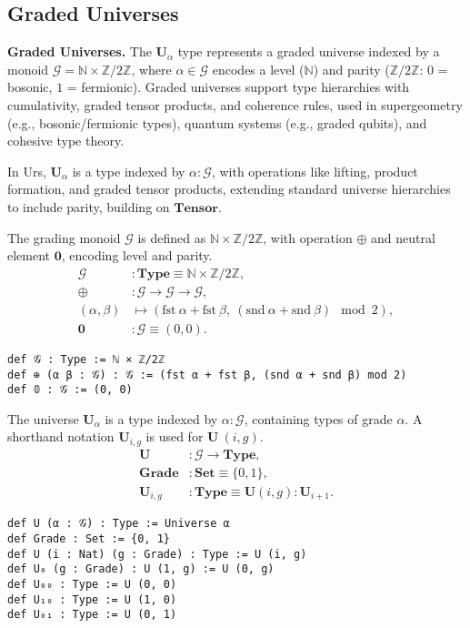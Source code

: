 \documentclass{article}
\begin{document}
\newpage
\subsection{Graded Universes}

\textbf{Graded Universes.}
The $\mathbf{U}_\alpha$ type represents a graded universe indexed by a monoid
$\mathcal{G} = \mathbb{N} \times \mathbb{Z}/2\mathbb{Z}$, where $\alpha \in \mathcal{G}$
encodes a level ($\mathbb{N}$) and parity ($\mathbb{Z}/2\mathbb{Z}$: $0$ = bosonic, $1$ = fermionic).
Graded universes support type hierarchies with cumulativity, graded tensor products,
and coherence rules, used in supergeometry (e.g., bosonic/fermionic types),
quantum systems (e.g., graded qubits), and cohesive type theory.

In Urs, $\mathbf{U}_\alpha$ is a type indexed by $\alpha : \mathcal{G}$, with operations
like lifting, product formation, and graded tensor products, extending standard
universe hierarchies to include parity, building on $\mathbf{Tensor}$.

\begin{definition}
The grading monoid $\mathcal{G}$ is defined as $\mathbb{N} \times \mathbb{Z}/2\mathbb{Z}$,
with operation $\oplus$ and neutral element $\mathbf{0}$, encoding level and parity.
\[
\begin{aligned}
\mathcal{G} & : \mathbf{Type} \equiv \mathbb{N} \times \mathbb{Z}/2\mathbb{Z}, \\
\oplus & : \mathcal{G} \to \mathcal{G} \to \mathcal{G}, \\
(\alpha, \beta) & \mapsto (\text{fst}\ \alpha + \text{fst}\ \beta,\ (\text{snd}\ \alpha + \text{snd}\ \beta) \mod 2), \\
\mathbf{0} & : \mathcal{G} \equiv (0, 0).
\end{aligned}
\]
\begin{lstlisting}[mathescape=true]
def 𝒢 : Type := ℕ × ℤ/2ℤ
def ⊕ (α β : 𝒢) : 𝒢 := (fst α + fst β, (snd α + snd β) mod 2)
def 𝟘 : 𝒢 := (0, 0)
\end{lstlisting}
\end{definition}

\begin{definition}
The universe $\mathbf{U}_\alpha$ is a type indexed by $\alpha : \mathcal{G}$,
containing types of grade $\alpha$. A shorthand notation $\mathbf{U}_{i,g}$
is used for $\mathbf{U}\ (i, g)$.
\[
\begin{aligned}
\mathbf{U} & : \mathcal{G} \to \mathbf{Type}, \\
\mathbf{Grade} & : \mathbf{Set} \equiv \{0, 1\}, \\
\mathbf{U}_{i,g} & : \mathbf{Type} \equiv \mathbf{U}(i, g) : \mathbf{U}_{i+1}.
\end{aligned}
\]
\begin{lstlisting}[mathescape=true]
def U (α : 𝒢) : Type := Universe α
def Grade : Set := {0, 1}
def U (i : Nat) (g : Grade) : Type := U (i, g)
def U₀ (g : Grade) : U (1, g) := U (0, g)
def U₀₀ : Type := U (0, 0)
def U₁₀ : Type := U (1, 0)
def U₀₁ : Type := U (0, 1)
\end{lstlisting}
\end{definition}
\end{document}
